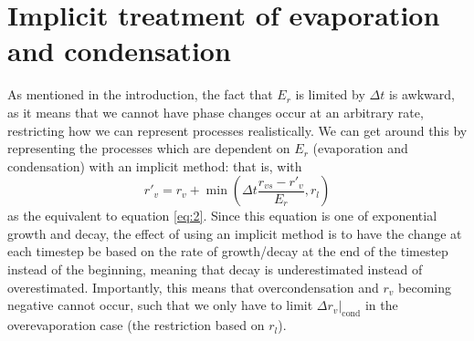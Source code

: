 \documentclass[11pt]{article}
\begin{document}
\section{Implicit treatment of evaporation and condensation}
As mentioned in the introduction, the fact that $E_r$ is limited by $\Delta t$ is awkward, as it means that we cannot have phase changes occur at an arbitrary rate, restricting how we can represent processes realistically. We can get around this by representing the processes which are dependent on $E_r$ (evaporation and condensation) with an implicit method: that is, with
\[
r'_v = r_v + \min\left(\Delta t\frac{r_{vs} - r'_v}{E_r},r_l\right)
\]
as the equivalent to equation \ref{eq:2}. Since this equation is one of exponential growth and decay, the effect of using an implicit method is to have the change at each timestep be based on the rate of growth/decay at the end of the timestep instead of the beginning, meaning that decay is underestimated instead of overestimated. Importantly, this means that overcondensation and $r_v$ becoming negative cannot occur, such that we only have to limit $\Delta r_v|_{\text{cond}}$ in the overevaporation case (the restriction based on $r_l$).
\end{document}
